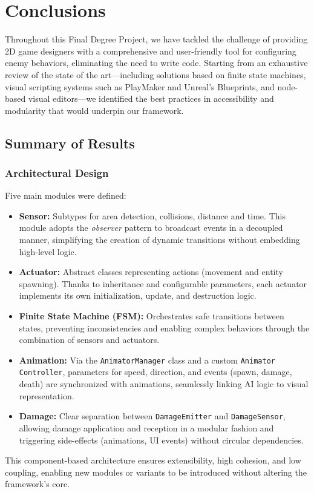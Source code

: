 \chapter*{Conclusions}
\label{cap:conclusions}



Throughout this Final Degree Project, we have tackled the challenge of providing 2D game designers with a comprehensive and user-friendly tool for configuring enemy behaviors, eliminating the need to write code. Starting from an exhaustive review of the state of the art—including solutions based on finite state machines, visual scripting systems such as PlayMaker and Unreal’s Blueprints, and node-based visual editors—we identified the best practices in accessibility and modularity that would underpin our framework.

\section*{Summary of Results}

\subsection*{Architectural Design}
Five main modules were defined:
\begin{itemize}
  \item \textbf{Sensor:} Subtypes for area detection, collisions, distance and time. This module adopts the \emph{observer} pattern to broadcast events in a decoupled manner, simplifying the creation of dynamic transitions without embedding high-level logic.
  \item \textbf{Actuator:} Abstract classes representing actions (movement and entity spawning). Thanks to inheritance and configurable parameters, each actuator implements its own initialization, update, and destruction logic.
  \item \textbf{Finite State Machine (FSM):} Orchestrates safe transitions between states, preventing inconsistencies and enabling complex behaviors through the combination of sensors and actuators.
  \item \textbf{Animation:} Via the \texttt{AnimatorManager} class and a custom \texttt{Animator Controller}, parameters for speed, direction, and events (spawn, damage, death) are synchronized with animations, seamlessly linking AI logic to visual representation.
  \item \textbf{Damage:} Clear separation between \texttt{DamageEmitter} and \texttt{DamageSensor}, allowing damage application and reception in a modular fashion and triggering side-effects (animations, UI events) without circular dependencies.
\end{itemize}
This component-based architecture ensures extensibility, high cohesion, and low coupling, enabling new modules or variants to be introduced without altering the framework’s core.

